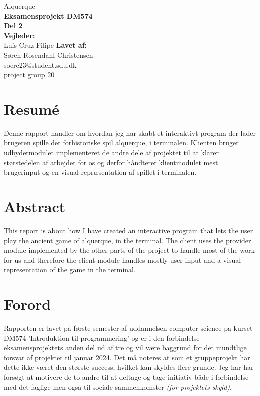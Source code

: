 \documentclass{article}
\begin{document}
\begin{titlepage}
    \vfill
    \clearpage\thispagestyle{empty}
    \centering
    {\Large Alquerque}\vspace{0.5cm}\\
    {\bfseries Eksamensprojekt DM574\\
    Del 2}\\
    \vfill
    {\bfseries Vejleder:}\\
    {Luís Cruz-Filipe}
    \vfill
    {\bfseries Lavet af:}\\
    {Søren Rosendahl Christensen\\
    soerc23@student.sdu.dk\\
    project group 20}
    \vskip6cm
\end{titlepage}
%
\section*{Resumé}
Denne rapport handler om hvordan jeg har skabt et interaktivt program der lader brugeren
spille det forhistoriske spil alquerque, i terminalen.
Klienten bruger udbydermodulet implementeret de andre dele af projektet til at klarer størstedelen af
arbejdet for os og derfor håndterer klientmodulet mest brugerinput og en visual
repræsentation af spillet i terminalen.

\section*{Abstract}
This report is about how I have created an interactive program that lets the user
play the ancient game of alquerque, in the terminal. 
The client uses the provider module implemented by the other parts of the project to handle most 
of the work for us and therefore the client module handles mostly user input and a visual representation of the game in the terminal.

%
\newpage
\section*{Forord}
Rapporten er lavet på første semester af uddannelsen computer-science på kurset DM574
'Introduktion til programmering' og er i den forbindelse eksamensprojektets 
anden del ud af tre og vil være baggrund for det mundtlige forsvar af projektet til januar 2024.
\bigbreak
Det må noteres at som et gruppeprojekt har dette ikke været den største success, hvilket kan
skyldes flere grunde. Jeg har har forsøgt at motivere de to andre til at
deltage og tage initiativ både i forbindelse med det faglige men også til sociale sammenkomster \textit{(for projektets skyld)}.
\clearpage
\tableofcontents
%
\newpage
\end{document}
